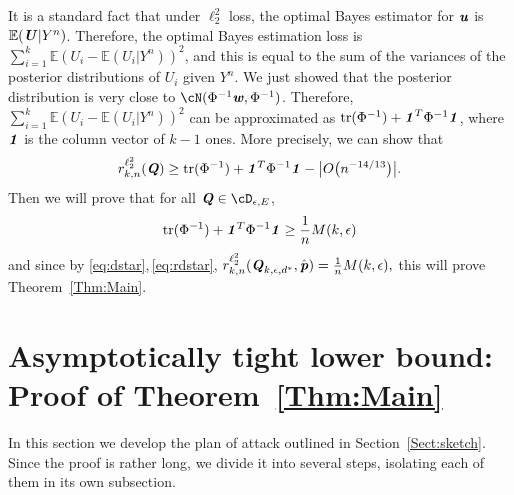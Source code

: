\documentclass[11pt,onecolumn]{IEEEtran}
\def\mathbi#1{{\textbf{\textit #1}}}
\DeclareMathOperator{\tr}{tr}
\begin{document}
It is a standard fact that under $\ell_2^2$ loss, the optimal Bayes estimator for $\mathbi{u}$ is $\mathbb{E}(\mathbi{U}|Y^n)$. Therefore, the optimal Bayes estimation loss is 
$\sum_{i=1}^k \mathbb{E}(U_i - \mathbb{E}(U_i|Y^n))^2$, and this is equal to the sum of the variances of the posterior distributions of $U_i$ given $Y^n$.
We just showed that the posterior distribution is very close to $\cN(\Phi^{-1}\mathbi{w}, \Phi^{-1})$. 
Therefore, $\sum_{i=1}^k \mathbb{E}(U_i - \mathbb{E}(U_i|Y^n))^2$
can be approximated as $\tr(\Phi^{-1}) + \mathbi{1}^T \Phi^{-1} \mathbi{1}$, where $\mathbi{1}$ is the column vector of $k-1$ ones. 
More precisely, we can show that
$$
r_{k,n}^{\ell_2^2} (\mathbi{Q}) \ge
\tr(\Phi^{-1}) + \mathbi{1}^T \Phi^{-1} \mathbi{1} - \big| O \big( n^{-14/13} \big) \big|.
$$
Then we will prove that for all $\mathbi{Q}\in \cD_{\epsilon,E}$,
$$
\tr(\Phi^{-1}) + \mathbi{1}^T \Phi^{-1} \mathbi{1}
\ge \frac 1n M(k,\epsilon)
$$
and since by \eqref{eq:dstar},\,\eqref{eq:rdstar}, $r_{k,n}^{\ell_2^2} (\mathbi{Q}_{k,\epsilon,d^\ast}, \hat{\mathbi{p}})=\frac 1n M(k,\epsilon),$ this 
will prove Theorem~\ref{Thm:Main}.


\section{Asymptotically tight lower bound: Proof of Theorem~\ref{Thm:Main}}\label{Sect:Main}
In this section we develop the plan of attack outlined in Section~\ref{Sect:sketch}. Since the proof is rather long, we divide it into several steps, isolating each of them in its own subsection.
\end{document}
